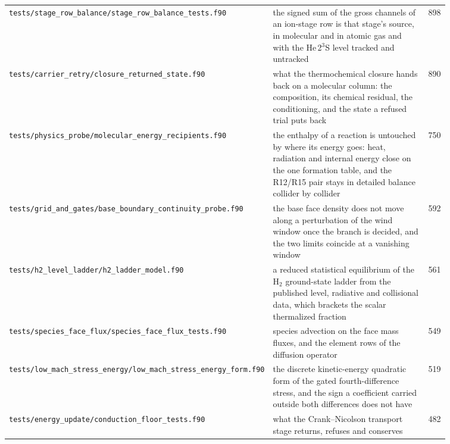 {\begin{longtable}{@{}>{\raggedright\arraybackslash}p{0.36\linewidth} >{\raggedright\arraybackslash}p{0.50\linewidth} r@{}}
\texttt{tests/\allowbreak stage\_\allowbreak row\_\allowbreak balance/\allowbreak stage\_\allowbreak row\_\allowbreak balance\_\allowbreak tests.f90} & the signed sum of the gross channels of an ion-stage row is that stage's source, in molecular and in atomic gas and with the He\,2$^3$S level tracked and untracked & 898 \\
\texttt{tests/\allowbreak carrier\_\allowbreak retry/\allowbreak closure\_\allowbreak returned\_\allowbreak state.f90} & what the thermochemical closure hands back on a molecular column: the composition, its chemical residual, the conditioning, and the state a refused trial puts back & 890 \\
\texttt{tests/\allowbreak physics\_\allowbreak probe/\allowbreak molecular\_\allowbreak energy\_\allowbreak recipients.f90} & the enthalpy of a reaction is untouched by where its energy goes: heat, radiation and internal energy close on the one formation table, and the R12/R15 pair stays in detailed balance collider by collider & 750 \\
\texttt{tests/\allowbreak grid\_\allowbreak and\_\allowbreak gates/\allowbreak base\_\allowbreak boundary\_\allowbreak continuity\_\allowbreak probe.f90} & the base face density does not move along a perturbation of the wind window once the branch is decided, and the two limits coincide at a vanishing window & 592 \\
\texttt{tests/\allowbreak h2\_\allowbreak level\_\allowbreak ladder/\allowbreak h2\_\allowbreak ladder\_\allowbreak model.f90} & a reduced statistical equilibrium of the H$_2$ ground-state ladder from the published level, radiative and collisional data, which brackets the scalar thermalized fraction & 561 \\
\texttt{tests/\allowbreak species\_\allowbreak face\_\allowbreak flux/\allowbreak species\_\allowbreak face\_\allowbreak flux\_\allowbreak tests.f90} & species advection on the face mass fluxes, and the element rows of the diffusion operator & 549 \\
\texttt{tests/\allowbreak low\_\allowbreak mach\_\allowbreak stress\_\allowbreak energy/\allowbreak low\_\allowbreak mach\_\allowbreak stress\_\allowbreak energy\_\allowbreak form.f90} & the discrete kinetic-energy quadratic form of the gated fourth-difference stress, and the sign a coefficient carried outside both differences does not have & 519 \\
\texttt{tests/\allowbreak energy\_\allowbreak update/\allowbreak conduction\_\allowbreak floor\_\allowbreak tests.f90} & what the Crank--Nicolson transport stage returns, refuses and conserves & 482 \\

\end{longtable}}
